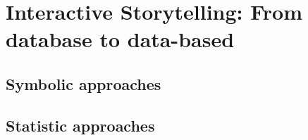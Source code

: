 \chapter{Interactive Storytelling: From database to data-based}
\label{chap:storytelling}
\section{Symbolic approaches}
\label{sec:symbolic}
\section{Statistic approaches}
\label{sec:statistic}
